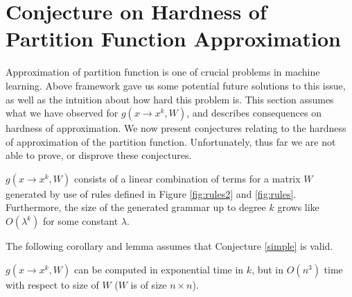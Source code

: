\section{Conjecture on Hardness of Partition Function Approximation}
Approximation of partition function is one of crucial problems in machine learning.
Above framework gave us some potential future solutions to this issue, as 
well as the intuition about how hard this problem is. This section assumes what we have
observed for $g(x \rightarrow x^k, W)$, and describes consequences on hardness of approximation.
We now present conjectures relating to the hardness of approximation
of the partition function. Unfortunately, thus far we are not able to prove, or disprove these conjectures.
\begin{conjecture}
  $g(x \rightarrow x^k, W)$ consists of a linear combination of terms
  for a matrix $W$ generated by use of rules defined in Figure
  \ref{fig:rules2} and \ref{fig:rules}. Furthermore, the size of the generated grammar up to degree $k$
  grows like $O(\lambda^k)$ for some constant $\lambda$.
\label{simple}
\end{conjecture}

The following corollary and lemma assumes that Conjecture \ref{simple} is valid.

\begin{corollary}
	$g(x \rightarrow x^k, W)$
	can be computed in exponential time in $k$, but in $O(n^3)$ time with respect to size of $W$ ($W$ is of size $n \times n$).
\end{corollary}

